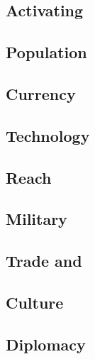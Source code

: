 \documentclass[12pt,a4paper,twocolumn,titlepage]{article}
\begin{document}
\subsection{Activating}
\label{sec:components}


\subsection{Population}
\label{sec:population}

% 

\subsection{Currency}
\label{sec:currency}


\subsection{Technology}
\label{sec:technology}


\subsection{Reach}
\label{sec:reach}


\subsection{Military}
\label{sec:military}

% 

\subsection{Trade and \convoys}
\label{sec:trade}


\subsection{Culture}
\label{sec:culture}


\subsection{Diplomacy}
\label{sec:diplomacy}

\end{document}
